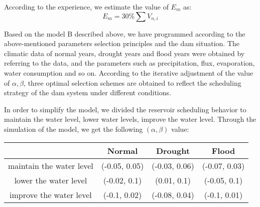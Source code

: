 \documentclass[nocover]{cumcmart}
\begin{document}
According to the experience, we estimate the value of $E_{m}$ as:
\begin{equation}
E_{m} = 30\%\sum V_{n, i}
\end{equation}

Based on the model B described above, we have programmed according to the above-mentioned parameters selection principles and the dam situation. The climatic data of normal years, drought years and flood years were obtained by referring to the data, and the parameters such as precipitation, flux, evaporation, water consumption and so on. According to the iterative adjustment of the value of $ \alpha, \beta $, three optimal selection schemes are obtained to reflect the scheduling strategy of the dam system under different conditions.

In order to simplify the model, we divided the reservoir scheduling behavior to maintain the water level, lower water levels, improve the water level. Through the simulation of the model, we get the following $ (\alpha, \beta) $ value:

\begin{table}[!hbp]
\centering
\begin{tabular}{|c|c|c|c|}
\hline
  & Normal & Drought & Flood \\
\hline
maintain the water level& (-0.05, 0.05) & (-0.03, 0.06) & (-0.07, 0.03) \\
\hline
lower the water level& (-0.02, 0.1) & (0.01, 0.1) & (-0.05, 0.1)  \\
\hline
improve the water level& (-0.1, 0.02) & (-0.08, 0.04) & (-0.1, 0.01) \\
\hline
\end{tabular}
\end{table}
\end{document}
